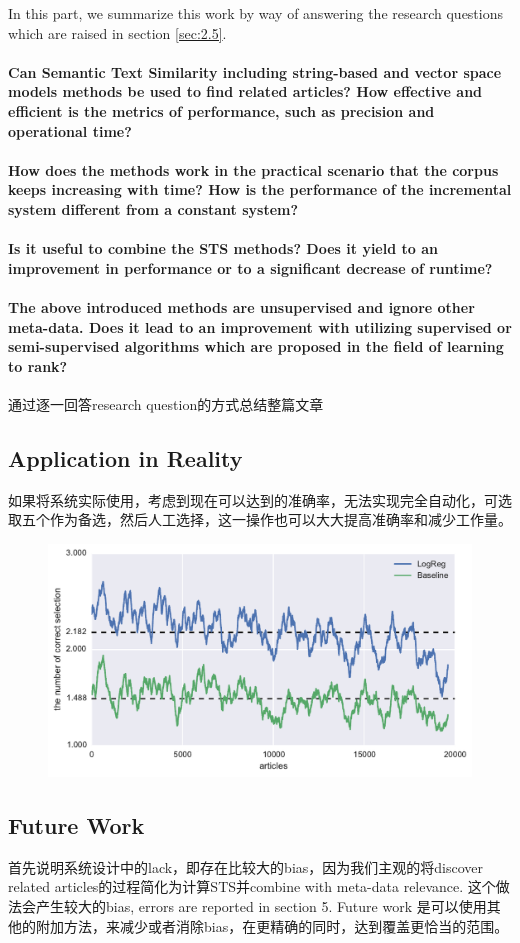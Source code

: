 In this part, we summarize this work by way of answering the research questions which are raised in section \ref{sec:2.5}. 

\paragraph{Can Semantic Text Similarity including string-based and vector space models methods be used to find related articles? How effective and efficient is the metrics of performance, such as precision and operational time?}



\paragraph{How does the methods work in the practical scenario that the corpus keeps increasing with time? How is the performance of the incremental system different from a constant system? }

\paragraph{Is it useful to combine the STS methods? Does it yield to an improvement in performance or to a significant decrease of runtime?}

\paragraph{The above introduced methods are unsupervised and ignore other meta-data. Does it lead to an improvement with utilizing supervised or semi-supervised algorithms which are proposed in the field of learning to rank?}
通过逐一回答research question的方式总结整篇文章

\subsection{Application in Reality}
如果将系统实际使用，考虑到现在可以达到的准确率，无法实现完全自动化，可选取五个作为备选，然后人工选择，这一操作也可以大大提高准确率和减少工作量。

\begin{figure}[!htb]
    \centering
    \includegraphics[width=\textwidth]{fig/precision_inc_supervised_5}
    \caption[]{}
    \label{fig:top5}
\end{figure}

\subsection{Future Work}
首先说明系统设计中的lack，即存在比较大的bias，因为我们主观的将discover related articles的过程简化为计算STS并combine with meta-data relevance. 这个做法会产生较大的bias, errors are reported in section 5. Future work 是可以使用其他的附加方法，来减少或者消除bias，在更精确的同时，达到覆盖更恰当的范围。
